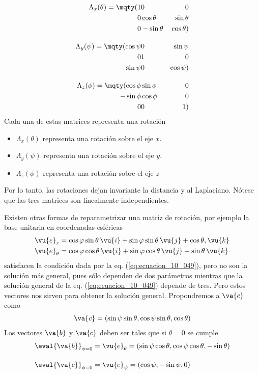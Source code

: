 \begin{align}
\Lambda_{x} (\theta) = \mqty(1 & 0 & 0 \\ 0 & \cos \theta & \sin \theta \\ 0 & -\sin \theta & \cos \theta) \label{eq:ecuacion_10_050} \\[1em]
\Lambda_{y} (\psi) = \mqty(\cos \psi & 0 & \sin \psi \\ 0 & 1 & 0 \\ - \sin \psi & 0 & \cos \psi) \label{eq:ecuacion_10_051} \\[1em]
\Lambda_{z} (\phi) = \mqty(\cos \phi & \sin \phi & 0 \\ - \sin \phi & \cos \phi & 0 \\ 0 & 0 & 1) \label{eq:ecuacion_10_052}
\end{align}
Cada una de estas matrices representa una rotación
\begin{itemize}
\item $\Lambda_{x} (\theta)$ representa una rotación sobre el eje $x$.
\item $\Lambda_{y} (\psi)$ representa una rotación sobre el eje $y$.
\item $\Lambda_{z} (\phi)$ representa una rotación sobre el eje $z$
\end{itemize}
Por lo tanto, las rotaciones dejan invariante la distancia y al Laplaciano. Nótese que las tres matrices son linealmente independientes.
\par
Existen otras formas de reparametrizar una matriz de rotación, por ejemplo la base unitaria en coordenadas esféricas
\begin{align*}
\vu{e}_{r} &= \cos \varphi \sin \theta \, \vu{i} + \sin \varphi \sin \theta \, \vu{j} + \cos \theta , \vu{k} \\
\vu{e}_{\theta} &= \cos \varphi \cos \theta \, \vu{i} + \sin \varphi \cos \theta \, \vu{j} - \sin \theta \, \vu{k}
\end{align*}
satisfacen la condición dada por la eq. (\ref{eq:ecuacion_10_049}), pero no son la solución más general, pues sólo dependen de dos parámetros mientras que la solución general de la eq. (\ref{eq:ecuacion_10_049}) depende de tres. Pero estos vectores nos sirven para obtener la solución general. Propondremos a $\va{c}$ como
\begin{align}
\va{c} = (\sin \psi \sin \theta, \cos \psi \sin \theta, \cos \theta)
\label{eq:ecuacion_10_053}
\end{align}
Los vectores $\va{b}$ y $\va{c}$ deben ser tales que si $\theta = 0$ se cumple
\begin{align}
\eval{\va{b}}_{\phi=0} &= \vu{e}_{\theta} = (\sin \psi \cos \theta, \cos \psi \cos \theta, - \sin \theta) \label{eq:ecuacion_10_054} \\[1em]
\eval{\va{c}}_{\phi=0} &= \vu{e}_{\psi} = (\cos \psi, -\sin \psi, 0) \label{eq:ecuacion_10_055}
\end{align}
